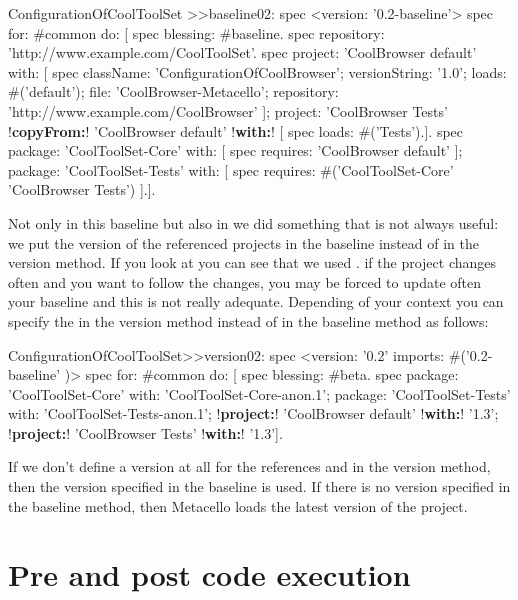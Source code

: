 \documentclass[a4paper,10pt,twoside]{book}
\begin{document}
\begin{code}{}
ConfigurationOfCoolToolSet >>baseline02: spec 
	<version: '0.2-baseline'>
	spec for: #common do: [
		spec blessing: #baseline.
		spec repository: 'http://www.example.com/CoolToolSet'.
		spec project: 'CoolBrowser default' with: [
				spec
					className: 'ConfigurationOfCoolBrowser';
					versionString: '1.0';
					loads: #('default');
					file: 'CoolBrowser-Metacello';
					repository: 'http://www.example.com/CoolBrowser' ];
			project: 'CoolBrowser Tests' 
				!\textbf{copyFrom:}! 'CoolBrowser default' 
				!\textbf{with:}! [ spec loads: #('Tests').].
		spec 
			package: 'CoolToolSet-Core' with: [ spec requires: 'CoolBrowser default' ];
			package: 'CoolToolSet-Tests' with: [ 
				spec requires: #('CoolToolSet-Core' 'CoolBrowser Tests') ].].					
\end{code}

Not only in this baseline but also in  we did something that is not always useful: we put the version of the referenced projects in the baseline instead of in the version method. If you look at  you can see that we used . if the project changes often and you want to follow the changes, you may be forced to update often your baseline and this is not really adequate. Depending of your context you can specify the  in the version method instead of in the baseline method as follows: 

\begin{code}{}
ConfigurationOfCoolToolSet>>version02: spec 
	<version: '0.2' imports: #('0.2-baseline' )>
	spec for: #common do: [
		spec blessing: #beta.
		spec 
			package: 'CoolToolSet-Core' with: 'CoolToolSet-Core-anon.1';
			package: 'CoolToolSet-Tests' with: 'CoolToolSet-Tests-anon.1';
			!\textbf{project:}! 'CoolBrowser default' !\textbf{with:}! '1.3';
			!\textbf{project:}! 'CoolBrowser Tests' !\textbf{with:}! '1.3'].
\end{code}

If we don't define a version at all for the references   and  in the version method, then the version specified in the baseline is used. If there is no version specified in the baseline method, then Metacello loads the latest version of the project.

\section{Pre and post code execution}
\end{document}
